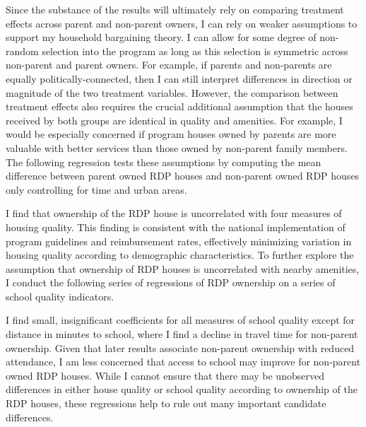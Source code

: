 \documentclass[11pt]{article} %
\begin{document}
Since the substance of the results will ultimately rely on comparing treatment effects across parent and non-parent owners, I can rely on weaker assumptions to support my household bargaining theory.  I can allow for some degree of non-random selection into the program as long as this selection is symmetric across non-parent and parent owners.  For example, if parents and non-parents are equally politically-connected, then I can still interpret differences in direction or magnitude of the two treatment variables.  However, the comparison between treatment effects also requires the crucial additional assumption that the houses received by both groups are identical in quality and amenities.  For example, I would be especially concerned if program houses owned by parents are more valuable with better services than those owned by non-parent family members.  The following regression tests these assumptions by computing the mean difference between parent owned RDP houses and non-parent owned RDP houses only controlling for time and urban areas.

\begin{center}
	
\end {center}

\pagebreak

I find that ownership of the RDP house is uncorrelated with four measures of housing quality.  This finding is consistent with the national implementation of program guidelines and reimbursement rates, effectively minimizing variation in housing quality according to demographic characteristics.  To further explore the assumption that ownership of RDP houses is uncorrelated with nearby amenities, I conduct the following series of regressions of RDP ownership on a series of school quality indicators.

\begin{center}
	
\end {center}

I find small, insignificant coefficients for all measures of school quality except for distance in minutes to school, where I find a decline in travel time for non-parent ownership.  Given that later results associate non-parent ownership with reduced attendance, I am less concerned that access to school may improve for non-parent owned RDP houses.  While I cannot ensure that there may be unobserved differences in either house quality or school quality according to ownership of the RDP houses, these regressions help to rule out many important candidate differences.
\end{document}
